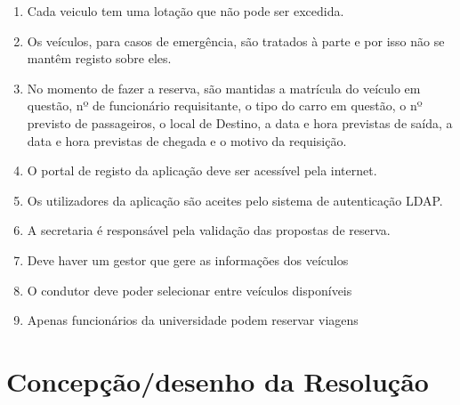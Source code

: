 \documentclass[11pt,a4paper]{report}%
\begin{document}
\begin{enumerate}
\item Cada veiculo tem uma lotação que não pode ser excedida.

\item Os veículos, para casos de emergência, são tratados à parte e por isso não se mantêm registo sobre eles.

\item No momento de fazer a reserva, são mantidas a matrícula do veículo em questão, nº de funcionário requisitante, o tipo do carro em questão, o nº previsto de passageiros, o local de Destino, a data e hora previstas de saída, a data e hora previstas de chegada e o motivo da requisição.

\item O portal de registo da aplicação deve ser acessível pela internet.

\item Os utilizadores da aplicação são aceites pelo sistema de autenticação LDAP.

\item A secretaria é responsável pela validação das propostas de reserva.

\item Deve haver um gestor que gere as informações dos veículos

\item O condutor deve poder selecionar entre veículos disponíveis
 
\item Apenas funcionários da universidade podem reservar viagens
\end{enumerate}







\newpage

\chapter{Concepção/desenho da Resolução}
\end{document}
